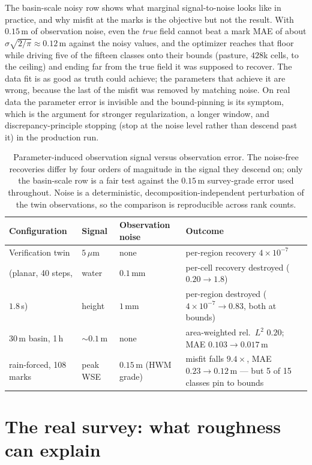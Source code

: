 \documentclass[11pt]{article}
\begin{document}
The basin-scale noisy row shows what marginal
signal-to-noise looks like in practice, and why misfit at the marks
is the objective but not the result. With $0.15$\,m of observation
noise, even the \emph{true} field cannot beat a mark MAE of about
$\sigma\sqrt{2/\pi} \approx 0.12$\,m against the noisy values, and
the optimizer reaches that floor while driving five of the fifteen
classes onto their bounds (pasture, $428$k cells, to the ceiling) and
ending far from the true field it was supposed to recover. The data
fit is as good as truth could achieve; the parameters that achieve it
are wrong, because the last of the misfit was removed by matching
noise. On real data the parameter error is invisible and the
bound-pinning is its symptom, which is the argument for stronger
regularization, a longer window, and discrepancy-principle stopping
(stop at the noise level rather than descend past it) in the
production run.

\begin{table}
\centering\footnotesize
\begin{tabular}{@{}llp{2.6cm}p{5.9cm}@{}}
\toprule
Configuration & Signal & Observation noise & Outcome \\
\midrule
Verification twin & $5\,\mu$m & none & per-region recovery $4\times10^{-7}$ \\
(planar, 40 steps, & water & $0.1$\,mm & per-cell recovery destroyed ($0.20 \to 1.8$) \\
$1.8$\,s) & height & $1$\,mm & per-region destroyed ($4\times10^{-7} \to 0.83$, both at bounds) \\
\midrule
30\,m basin, 1\,h & $\sim 0.1$\,m & none & area-weighted rel.\ $L^2$ $0.20$; MAE $0.103 \to 0.017$\,m \\
rain-forced, 108 marks & peak WSE & $0.15$\,m (HWM grade) & misfit falls $9.4\times$, MAE $0.23 \to 0.12$\,m --- but 5 of 15 classes pin to bounds \\
\bottomrule
\end{tabular}
\caption{Parameter-induced observation signal versus observation error.
The noise-free recoveries differ by four orders of magnitude in the
signal they descend on; only the basin-scale row is a fair test against
the $0.15$\,m survey-grade error used throughout. Noise is a
deterministic, decomposition-independent perturbation of the twin
observations, so the comparison is reproducible across rank counts.}
\label{tab:snr}
\end{table}

\section{The real survey: what roughness can explain}
\label{sec:realsurvey}
\end{document}
